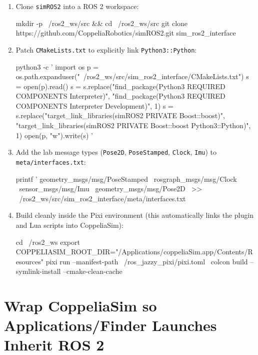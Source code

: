 \documentclass[11pt,a4paper]{article}
\begin{document}
\begin{enumerate}[leftmargin=1.5em]
  \item Clone \texttt{simROS2} into a ROS 2 workspace:
\begin{cmdbox}
mkdir -p ~/ros2_ws/src && cd ~/ros2_ws/src
git clone https://github.com/CoppeliaRobotics/simROS2.git sim_ros2_interface
\end{cmdbox}

  \item Patch \texttt{CMakeLists.txt} to explicitly link \texttt{Python3::Python}:
\begin{cmdbox}
python3 -c '
import os
p = os.path.expanduser("~/ros2_ws/src/sim_ros2_interface/CMakeLists.txt")
s = open(p).read()
s = s.replace("find_package(Python3 REQUIRED COMPONENTS Interpreter)",
              "find_package(Python3 REQUIRED COMPONENTS Interpreter Development)", 1)
s = s.replace("target_link_libraries(simROS2 PRIVATE Boost::boost)",
              "target_link_libraries(simROS2 PRIVATE Boost::boost Python3::Python)", 1)
open(p, "w").write(s)
'
\end{cmdbox}

  \item Add the lab message types (\texttt{Pose2D}, \texttt{PoseStamped}, \texttt{Clock}, \texttt{Imu}) to \texttt{meta/interfaces.txt}:
\begin{cmdbox}
printf '%
  geometry_msgs/msg/PoseStamped \
  rosgraph_msgs/msg/Clock \
  sensor_msgs/msg/Imu \
  geometry_msgs/msg/Pose2D \
  >> ~/ros2_ws/src/sim_ros2_interface/meta/interfaces.txt
\end{cmdbox}

  \item Build cleanly inside the Pixi environment (this automatically links the plugin and Lua scripts into CoppeliaSim):
\begin{cmdbox}
cd ~/ros2_ws
export COPPELIASIM_ROOT_DIR="/Applications/coppeliaSim.app/Contents/Resources"
pixi run --manifest-path ~/ros_jazzy_pixi/pixi.toml \
  colcon build --symlink-install --cmake-clean-cache
\end{cmdbox}
\end{enumerate}

\section{Wrap CoppeliaSim so Applications/Finder Launches Inherit ROS 2}
\end{document}
